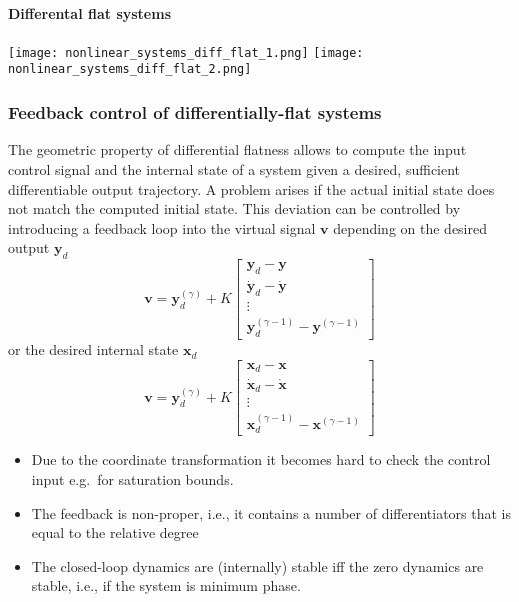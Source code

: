 \paragraph{Differental flat systems}
\begin{center}
    \texttt{[image: nonlinear\_systems\_diff\_flat\_1.png]}
    \texttt{[image: nonlinear\_systems\_diff\_flat\_2.png]}
\end{center}

\subsubsection{Feedback control of differentially-flat systems}
The geometric property of differential flatness allows to compute the input control signal and the internal state of a system given a desired, sufficient differentiable output trajectory. A problem arises if the actual initial state does not match the computed initial state. This deviation can be controlled by introducing a feedback loop into the virtual signal $\mathbf{v}$ depending on the desired output $\mathbf{y}_d$
\begin{equation*}
    \mathbf{v} = \mathbf{y}_d^{(\gamma)} + K \begin{bmatrix}
        \mathbf{y}_d - \mathbf{y}             \\
        \dot{\mathbf{y}}_d - \dot{\mathbf{y}} \\
        \vdots              \\
        \mathbf{y}_d^{(\gamma-1)} - \mathbf{y}^{(\gamma-1)}
    \end{bmatrix}
\end{equation*}
or the desired internal state $\mathbf{x}_d$
\begin{equation*}
    \mathbf{v} = \mathbf{y}_d^{(\gamma)} + K \begin{bmatrix}
        \mathbf{x}_d - \mathbf{x}             \\
        \dot{\mathbf{x}}_d - \dot{\mathbf{x}} \\
        \vdots              \\
        \mathbf{x}_d^{(\gamma-1)} - \mathbf{x}^{(\gamma-1)}
    \end{bmatrix}
\end{equation*}

\newpar{}
\begin{itemize}
    \item Due to the coordinate transformation it becomes hard to check the control input e.g.\ for saturation bounds.
    \item The feedback is non-proper, i.e., it contains a number of differentiators that is equal to the relative degree
    \item The closed-loop dynamics are (internally) stable iff the zero dynamics are stable, i.e., if the system is minimum phase.
\end{itemize}

